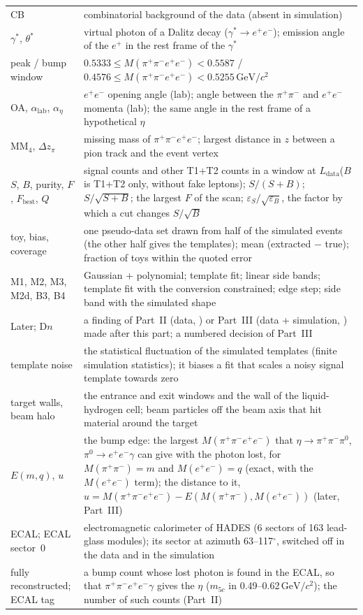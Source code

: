 \documentclass[11pt,a4paper]{article}
\newcommand{\piz}{\ensuremath{\pi^{0}}\xspace}
\newcommand{\ee}{\ensuremath{e^{+}e^{-}}\xspace}
\newcommand{\pipi}{\ensuremath{\pi^{+}\pi^{-}}\xspace}
\newcommand{\ppee}{\ensuremath{\pi^{+}\pi^{-}e^{+}e^{-}}\xspace}
\newcommand{\Mfour}{\ensuremath{M(\pi^{+}\pi^{-}e^{+}e^{-})}\xspace}
\newcommand{\Mee}{\ensuremath{M(e^{+}e^{-})}\xspace}
\newcommand{\Mpipi}{\ensuremath{M(\pi^{+}\pi^{-})}\xspace}
\newcommand{\GeVcc}{\ensuremath{\mathrm{GeV}/c^{2}}\xspace}
\newcommand{\Ldata}{\ensuremath{L_{\mathrm{data}}}\xspace}
\newcommand{\code}[1]{\texttt{\detokenize{#1}}}
\begin{document}
{\begin{longtable}{@{}>{\raggedright\arraybackslash}p{3.2cm} >{\raggedright\arraybackslash}p{\dimexpr\textwidth-3.2cm-2\tabcolsep\relax}@{}}
CB & combinatorial background of the data (absent in simulation) \\
$\gamma^*$, $\theta^*$ & virtual photon of a Dalitz decay ($\gamma^*\to\ee$); emission angle of the $e^+$ in the rest frame of the $\gamma^*$ \\
peak / bump window & $0.5333\le\Mfour<0.5587$ / $0.4576\le\Mfour<0.5255$\,\GeVcc \\
OA, $\alpha_{\mathrm{lab}}$, $\alpha_\eta$ & \ee opening angle (lab); angle between the \pipi and \ee momenta (lab); the same angle in the rest frame of a hypothetical $\eta$ \\
$\mathrm{MM}_4$, $\Delta z_\pi$ & missing mass of \ppee; largest distance in $z$ between a pion track and the event vertex \\
$S$, $B$, purity, $F$, $F_{\mathrm{best}}$, $Q$ & signal counts and other T1+T2 counts in a window at \Ldata ($B$ is T1+T2 only, without fake leptons); $S/(S+B)$; $S/\sqrt{S+B}$; the largest $F$ of the scan; $\varepsilon_S/\sqrt{\varepsilon_B}$, the factor by which a cut changes $S/\sqrt{B}$ \\
toy, bias, coverage & one pseudo-data set drawn from half of the simulated events (the other half gives the templates); mean (extracted $-$ true); fraction of toys within the quoted error \\
M1, M2, M3, M2d, B3, B4 & Gaussian + polynomial; template fit; linear side bands; template fit with the conversion constrained; edge step; side band with the simulated shape \\
Later; D$n$ & a finding of Part~II (data, \code{report_exp.pdf}) or Part~III (data + simulation, \code{report_all.pdf}) made after this part; a numbered decision of Part~III \\
template noise & the statistical fluctuation of the simulated templates (finite simulation statistics); it biases a fit that scales a noisy signal template towards zero \\
target walls, beam halo & the entrance and exit windows and the wall of the liquid-hydrogen cell; beam particles off the beam axis that hit material around the target \\
$E(m,q)$, $u$ & the bump edge: the largest \Mfour that $\eta\to\pipi\piz$, $\piz\to\ee\gamma$ can give with the photon lost, for $\Mpipi=m$ and $\Mee=q$ (exact, with the \Mee term); the distance to it, $u=\Mfour-E(\Mpipi,\Mee)$ (later, Part~III) \\
ECAL; ECAL sector~0 & electromagnetic calorimeter of HADES (6 sectors of 163 lead-glass modules); its sector at azimuth 63--117$^\circ$, switched off in the data and in the simulation \\
fully reconstructed; ECAL tag & a bump count whose lost photon is found in the ECAL, so that $\pipi\ee\gamma$ gives the $\eta$ ($m_{5c}$ in 0.49--0.62\,\GeVcc); the number of such counts (Part~II) \\
\bottomrule
\end{longtable}
}
\end{document}
